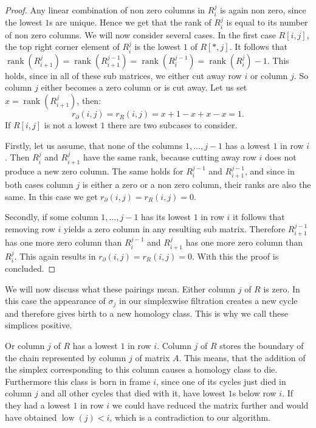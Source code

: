 \begin{proof}
Any linear combination of non zero columns in $R_i^j$ is again non zero, since the lowest $1$s are unique. Hence we get that the rank of $R_i^j$ is equal to its number of non zero columns. We will now consider several cases.
In the first case $R[i,j]$, the top right corner element of $R_i^j$ is the lowest $1$ of $R[*,j]$.
It follows that $\operatorname{rank}(R_{i+1}^{j}) = \operatorname{rank}(R_{i+1}^{j-1}) = \operatorname{rank}(R_{i}^{j-1}) = \operatorname{rank}(R_i^j)-1$. This holds, since in all of these sub matrices, we either cut away row $i$ or column $j$. So column $j$ either becomes a zero column or is cut away. Let us set $x = \operatorname{rank}(R_{i+1}^{j})$, then: \[r_\partial(i,j) = r_R(i,j) = x+1 - x + x -x =1.\]
If $R[i,j]$ is not a lowest $1$ there are two subcases to consider. 

Firstly, let us assume, that none of the columns $1,\dots,j-1$ has a lowest $1$ in row $i$. Then $R_i^{j}$ and $R_{i+1}^{j}$ have the same rank, because cutting away row $i$ does not produce a new zero column. The same holds for $R_i^{j-1}$ and $R_{i+1}^{j-1}$, and since in both cases column $j$ is either a zero or a non zero column, their ranks are also the same. In this case we get $r_\partial(i,j) = r_R(i,j) = 0$.

Secondly, if some column $1,\dots,j-1$ has its lowest $1$ in row $i$ it follows that removing row $i$ yields a zero column in any resulting sub matrix. Therefore $R_{i+1}^{j-1}$ has one more zero column than $R_{i}^{j-1}$ and $R_{i+1}^{j}$ has one more zero column than $R_{i}^{j}$. This again results in $r_\partial(i,j) = r_R(i,j) = 0$. With this the proof is concluded.
\end{proof}

We will now discuss what these pairings mean. Either column $j$ of $R$ is zero. In this case the appearance of $\sigma_j$ in our simplexwise filtration creates a new cycle and therefore gives birth to a new homology class. This is why we call these simplices positive. 

Or column $j$ of $R$ has a lowest $1$ in row $i$. Column $j$ of $R$ stores the boundary of the chain represented by column $j$ of matrix $A$. This means, that the addition of the simplex corresponding to this column causes a homology class to die. Furthermore this class is born in frame $i$, since one of its cycles just died in column $j$ and all other cycles that died with it, have lowest $1$s below row $i$. If they had a lowest $1$ in row $i$ we could have reduced the matrix further and would have obtained $\operatorname{low}(j)<i$, which is a contradiction to our algorithm.

